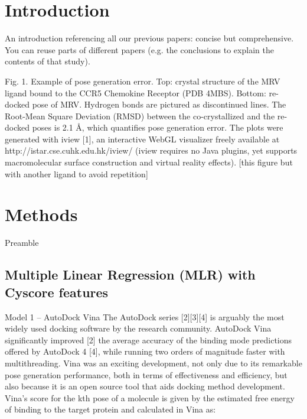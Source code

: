 \documentclass[twocolumn]{bmcart}
\begin{document}

\section*{Introduction}

An introduction referencing all our previous papers: concise but comprehensive. You can reuse parts of different papers (e.g. the conclusions to explain the contents of that study).

Fig. 1. Example of pose generation error. Top: crystal structure of the MRV ligand bound to the CCR5 Chemokine Receptor (PDB 4MBS). Bottom: re-docked pose of MRV. Hydrogen bonds are pictured as discontinued lines. The Root-Mean Square Deviation (RMSD) between the co-crystallized and the re-docked poses is 2.1 Å, which quantifies pose generation error. The plots were generated with iview [1], an interactive WebGL visualizer freely available at http://istar.cse.cuhk.edu.hk/iview/ (iview requires no Java plugins, yet supports macromolecular surface construction and virtual reality effects). [this figure but with another ligand to avoid repetition]

\section*{Methods}

Preamble

\subsection*{Multiple Linear Regression (MLR) with Cyscore features}

Model 1 – AutoDock Vina
The AutoDock series [2][3][4] is arguably the most widely used docking software by the research community. AutoDock Vina significantly improved [2] the average accuracy of the binding mode predictions offered by AutoDock 4 [4], while running two orders of magnitude faster with multithreading. Vina was an exciting development, not only due to its remarkable pose generation performance, both in terms of effectiveness and efficiency, but also because it is an open source tool that aids docking method development. 
Vina’s score for the kth pose of a molecule is given by the estimated free energy of binding to the target protein and calculated in Vina as:

	                                               
\end{document}
